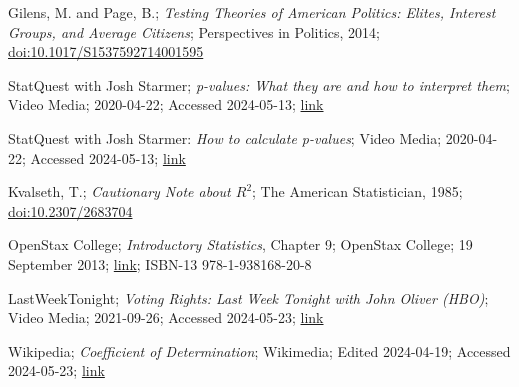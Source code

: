 \begin{thebibliography}{9}
	 Gilens, M. and Page, B.; \textit{Testing Theories of American Politics:	Elites, Interest Groups, and Average Citizens}; Perspectives in Politics, 2014; \href{https://doi.org/10.1017/S1537592714001595}{doi:10.1017/S1537592714001595}
	
	 StatQuest with Josh Starmer; \textit{p-values: What they are and how to interpret them}; Video Media; 2020-04-22; Accessed 2024-05-13; \href{https://youtu.be/vemZtEM63GY?si=16kgerT8beT_EkOc}{link}
	
	 StatQuest with Josh Starmer: \textit{How to calculate p-values}; Video Media; 2020-04-22; Accessed 2024-05-13; \href{https://youtu.be/JQc3yx0-Q9E?si=M0vKNOTDjNuImq0k}{link}
	
	 Kvalseth, T.; \textit{Cautionary Note about $R^2$}; The American Statistician, 1985; \href{https://sci-hub.ru/https://doi.org/10.2307/2683704}{doi:10.2307/2683704}
	
	 OpenStax College; \textit{Introductory Statistics}, Chapter 9; OpenStax College; 19 September 2013; \href{http://cnx.org/content/col11562/latest/}{link}; ISBN-13 978-1-938168-20-8
	
	 LastWeekTonight; \textit{Voting Rights: Last Week Tonight with John Oliver (HBO)}; Video Media; 2021-09-26; Accessed 2024-05-23; \href{https://www.youtube.com/watch?v=EN9OdruH_qM}{link}
	
	 Wikipedia; \textit{Coefficient of Determination}; Wikimedia; Edited 2024-04-19; Accessed 2024-05-23; \href{https://en.wikipedia.org/wiki/Coefficient_of_determination}{link}
\end{thebibliography}
